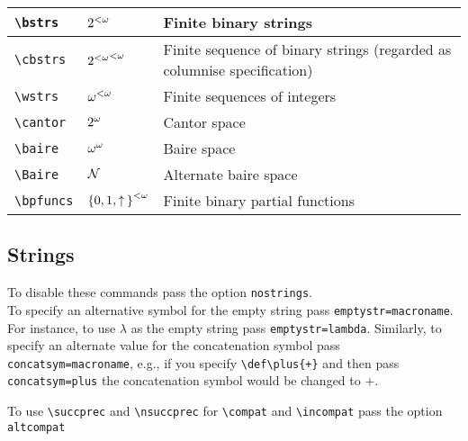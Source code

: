 \documentclass[leqno,11pt]{amsart}
\begin{document}
\begin{tabular}{l |  l | l}\toprule
	\verb=\bstrs=		       & \( 2^{<\omega}  \) & Finite binary strings        \\	\midrule
	\verb=\cbstrs=		       & \( {2^{< \omega}}^{< \omega}  \) & Finite sequence of binary strings (regarded as columnise specification)      \\	\midrule
	\verb=\wstrs=                 & \( \omega^{<\omega}  \) & Finite sequences of integers \\ 	\midrule
	\verb=\cantor=                & \( 2^{\omega} \) & Cantor space		     \\    \midrule
	\verb=\baire=                 & \( \omega^{\omega}  \) & Baire space                  \\[6pt]
	\verb=\Baire=                 & \( \mathcal{N}  \) & Alternate baire space        \\ \midrule
	\verb=\bpfuncs= 							& \( {\lbrace 0,1, \mathpunct{\uparrow} \rbrace}^{< \omega} \) & Finite binary partial functions      \\	
		\bottomrule
	\end{tabular}

\subsection{Strings}
To disable these commands pass the option \verb=nostrings=.\\

To specify an alternative symbol for the empty string pass \verb!emptystr=macroname!.  For instance, to use \( \lambda \) as the empty string pass \verb!emptystr=lambda!.  Similarly, to specify an alternate value for the concatenation symbol pass \verb!concatsym=macroname!, e.g., if you specify \verb!\def\plus{+}! and then pass \verb!concatsym=plus! the concatenation symbol would be changed to \( + \). 

To use \verb=\succprec= and \verb=\nsuccprec= for \verb=\compat= and \verb=\incompat= pass the option \verb=altcompat=
\end{document}
